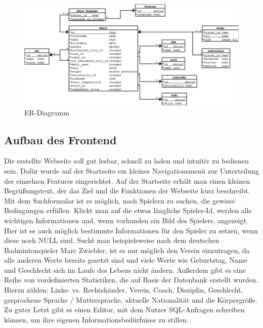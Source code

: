 \documentclass[12pt,a4paper]{article}
\begin{document}
\begin{figure}[H]
\centering
\includegraphics[width=1\textwidth] {ER-Diagramm} 
\caption{ER-Diagramm}
\label{fig:ER-Diagramm}
\end{figure}

\subsection{Aufbau des Frontend}
\label{Frontend}
Die erstellte Webseite soll gut lesbar, schnell zu laden und intuitiv zu bedienen sein. Dafür wurde auf der Startseite ein kleines Navigationsmenü zur Unterteilung der einzelnen Features eingerichtet. Auf der Startseite erhält man einen kleinen Begrüßungstext, der das Ziel und die Funktionen der Webseite kurz beschreibt. Mit dem Suchformular ist es möglich, nach Spielern zu suchen, die gewisse Bedingungen erfüllen. Klickt man auf die etwas längliche Spieler-Id, werden alle wichtigen Informationen und, wenn vorhanden ein Bild des Spielers, angezeigt. Hier ist es auch möglich bestimmte Informationen für den Spieler zu setzen, wenn diese noch \glqq NULL\grqq{} sind. Sucht man beispielsweise nach dem deutschen Badmintonspieler Marc Zwiebler, ist es nur möglich den Verein einzutragen, da alle anderen Werte bereits gesetzt sind und viele Werte wie Geburtstag, Name und Geschlecht sich im Laufe des Lebens nicht ändern.
\newline
Außerdem gibt es eine Reihe von vordefinierten Statistiken, die auf Basis der Datenbank erstellt wurden. Hierzu zählen:
Links- vs. Rechtshänder, Verein, Coach, Disziplin, Geschlecht, gesprochene Sprache / Muttersprache, aktuelle Nationalität und die Körpergröße. Zu guter Letzt gibt es einen Editor, mit dem Nutzer SQL-Anfragen schreiben können, um ihre eigenen Informationsbedürfnisse zu stillen.
\end{document}
